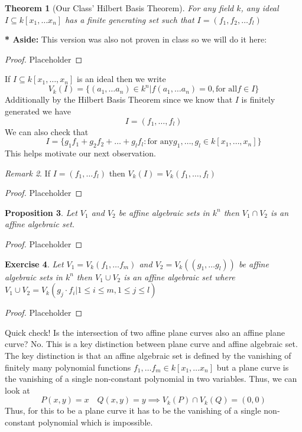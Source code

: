 \documentclass[11pt,a4paper]{article}
\newenvironment{asidebar}{%
    \def\FrameCommand{\vrule width 1.5pt \hspace{8pt}}%
    \MakeFramed{\advance\hsize-\width\FrameRestore}%
}{\endMakeFramed}
\newcommand{\aside}[1]{\begin{asidebar}\noindent\textbf{* Aside:} #1\end{asidebar}}
\theoremstyle{plain}
\newtheorem{theorem}{Theorem}[section]
\newtheorem{proposition}[theorem]{Proposition}
\newtheorem{exercise}[theorem]{Exercise}
\theoremstyle{definition}
\theoremstyle{remark}
\newtheorem{remark}[theorem]{Remark}
\begin{document}
\begin{theorem}[Our Class' Hilbert Basis Theorem]
    For any field $k$, any ideal $I \subseteq k[x_1, \dots x_n]$ has a finite generating set such that $I = (f_1, f_2, \dots f_l)$
\end{theorem}

\aside{This version was also not proven in class so we will do it here: \begin{proof}
    Placeholder
\end{proof}}

\noindent
If $I \subseteq k[x_1, \dots, x_n]$ is an ideal then we write $$V_k(I) = \{(a_1, \dots a_n) \in k^n | f(a_1, \dots a_n) = 0, \text{for all} f \in I\} $$ Additionally by the Hilbert Basis Theorem since we know that $I$ is finitely generated we have $$I = (f_1, \dots, f_l)$$ We can also check that $$I = \{g_1f_1+g_2f_2 +\dots + g_lf_l : \text{for any} g_1, \dots, g_l \in k[x_1, \dots,x_n]\}$$ This helps motivate our next observation.

\begin{remark}
    If $I = (f_1, \dots f_l)$ then $V_k(I) = V_k(f_1, \dots, f_l)$ 
\end{remark}

\begin{proof}
    Placeholder
\end{proof}

\begin{proposition}
    Let $V_1$ and $V_2$ be affine algebraic sets in $k^n$ then $V_1 \cap V_2$ is an affine algebraic set.
\end{proposition}

\begin{proof}
    Placeholder
\end{proof}

\begin{exercise}
    Let $V_1 = V_k(f_1, \dots f_m)$ and $V_2 = V_k((g_1, \dots g_l))$ be affine algebraic sets in $k^n$ then $V_1 \cup V_2$ is an affine algebraic set where $V_1 \cup V_2 = V_k(g_j \cdot f_i | 1 \leq i \leq m, 1 \leq j \leq l)$
\end{exercise}

\begin{proof}
    Placeholder
\end{proof}

\noindent
Quick check! Is the intersection of two affine plane curves also an affine plane curve? No. This is a key distinction between plane curve and affine algebraic set. The key distinction is that an affine algebraic set is defined by the vanishing of finitely many polynomial functions $f_1, \dots f_m \in k[x_1, \dots x_n]$ but a plane curve is the vanishing of a single non-constant polynomial in two variables. Thus, we can look at $$P(x,y) =x \quad Q(x,y) = y \implies V_k(P) \cap V_k(Q) = (0,0) $$ Thus, for this to be a plane curve it has to be the vanishing of a single non-constant polynomial which is impossible. 
\end{document}
